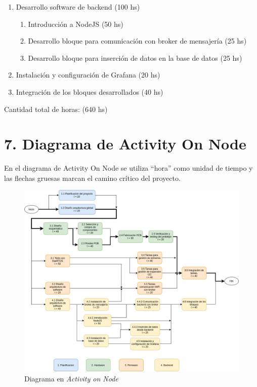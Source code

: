 \documentclass[11pt]{charter}
\begin{document}
\begin{enumerate}
\begin{enumerate}
	\item Desarrollo software de backend (100 hs)
		\begin{enumerate}
		\item Introducción a NodeJS (50 hs)
		\item Desarrollo bloque para comunicación con broker de mensajería (25 hs)
		\item Desarrollo bloque para inserción de datos en la base de datos (25 hs)
		\end{enumerate}
	\item Instalación y configuración de Grafana (20 hs)
	\item Integración de los bloques desarrollados (40 hs)
	\end{enumerate}
\end{enumerate}

Cantidad total de horas: (640 hs)

\clearpage

\section{7. Diagrama de Activity On Node}
\label{sec:AoN}

En el diagrama de Activity On Node se utiliza ``hora'' como unidad de tiempo y las flechas gruesas marcan el camino crítico del proyecto.




\begin{figure}[htpb]
\centering 
\includegraphics[width=\textwidth]{./Figuras/AoN.png}
\caption{Diagrama en \textit{Activity on Node}}
\label{fig:AoN}
\end{figure}
\end{document}
